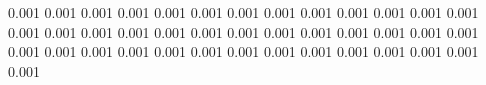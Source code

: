 0.001      0.001      %
0.001      0.001      %
0.001      0.001      %
0.001      0.001      %
0.001      0.001      %
0.001      0.001      %
0.001      0.001      %
0.001      0.001      %
0.001      0.001      %
0.001      0.001      %
0.001      0.001      %
0.001      0.001      %
0.001      0.001      %
0.001      0.001      %
0.001      0.001      %
0.001      0.001      %
0.001      0.001      %
0.001      0.001      %
0.001      0.001      %
0.001      0.001      %

